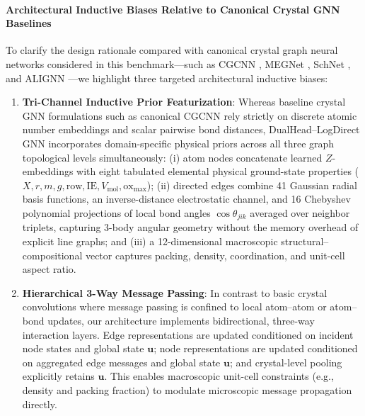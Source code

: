 \documentclass[final,3p,times]{elsarticle}
\begin{document}
\paragraph{Architectural Inductive Biases Relative to Canonical Crystal GNN Baselines}
To clarify the design rationale compared with canonical crystal graph neural networks considered in this benchmark---such as CGCNN \cite{xie2018crystal}, MEGNet \cite{chen2019graph}, SchNet \cite{schutt2017schnet}, and ALIGNN \cite{choudhary2021atomistic}---we highlight three targeted architectural inductive biases:
\begin{enumerate}
    \item \textbf{Tri-Channel Inductive Prior Featurization}: Whereas baseline crystal GNN formulations such as canonical CGCNN rely strictly on discrete atomic number embeddings and scalar pairwise bond distances, DualHead--LogDirect GNN incorporates domain-specific physical priors across all three graph topological levels simultaneously: (i) atom nodes concatenate learned $Z$-embeddings with eight tabulated elemental physical ground-state properties ($X, r, m, g, \text{row}, \text{IE}, V_{\mathrm{mol}}, \text{ox}_{\max}$); (ii) directed edges combine 41 Gaussian radial basis functions, an inverse-distance electrostatic channel, and 16 Chebyshev polynomial projections of local bond angles $\cos\theta_{jik}$ averaged over neighbor triplets, capturing 3-body angular geometry without the memory overhead of explicit line graphs; and (iii) a 12-dimensional macroscopic structural--compositional vector captures packing, density, coordination, and unit-cell aspect ratio.
    \item \textbf{Hierarchical 3-Way Message Passing}: In contrast to basic crystal convolutions where message passing is confined to local atom--atom or atom--bond updates, our architecture implements bidirectional, three-way interaction layers. Edge representations are updated conditioned on incident node states and global state $\mathbf{u}$; node representations are updated conditioned on aggregated edge messages and global state $\mathbf{u}$; and crystal-level pooling explicitly retains $\mathbf{u}$. This enables macroscopic unit-cell constraints (e.g., density and packing fraction) to modulate microscopic message propagation directly.

\end{enumerate}
\end{document}
